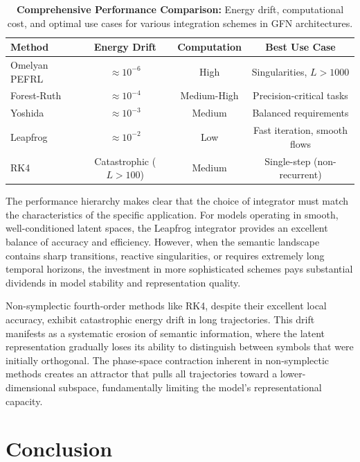 \documentclass[12pt,a4paper]{article}
\begin{document}
\begin{table}[htbp]
\centering
\begin{tabular}{@{}lccc@{}}
\toprule
\textbf{Method} & \textbf{Energy Drift} & \textbf{Computation} & \textbf{Best Use Case} \\
\midrule
Omelyan PEFRL & $\approx 10^{-6}$ & High & Singularities, $L > 1000$ \\
Forest-Ruth & $\approx 10^{-4}$ & Medium-High & Precision-critical tasks \\
Yoshida & $\approx 10^{-3}$ & Medium & Balanced requirements \\
Leapfrog & $\approx 10^{-2}$ & Low & Fast iteration, smooth flows \\
\midrule
RK4 & Catastrophic ($L > 100$) & Medium & Single-step (non-recurrent) \\
\bottomrule
\end{tabular}
\caption{\textbf{Comprehensive Performance Comparison:} Energy drift, 
         computational cost, and optimal use cases for various integration 
         schemes in GFN architectures.}
\label{tab:performance}
\end{table}

The performance hierarchy makes clear that the choice of integrator must match the characteristics of the specific application. For models operating in smooth, well-conditioned latent spaces, the Leapfrog integrator provides an excellent balance of accuracy and efficiency. However, when the semantic landscape contains sharp transitions, reactive singularities, or requires extremely long temporal horizons, the investment in more sophisticated schemes pays substantial dividends in model stability and representation quality.

Non-symplectic fourth-order methods like RK4, despite their excellent local accuracy, exhibit catastrophic energy drift in long trajectories. This drift manifests as a systematic erosion of semantic information, where the latent representation gradually loses its ability to distinguish between symbols that were initially orthogonal. The phase-space contraction inherent in non-symplectic methods creates an attractor that pulls all trajectories toward a lower-dimensional subspace, fundamentally limiting the model's representational capacity.

\section{Conclusion}
\end{document}
